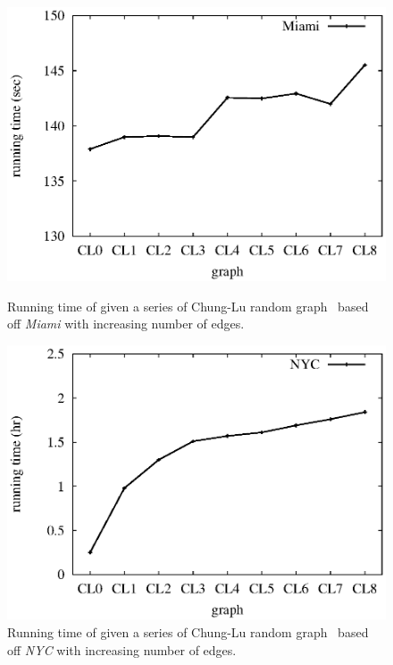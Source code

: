 \begin{figure}[htbp]
\hfill
\begin{minipage}[t]{0.45\linewidth}
\begin{center}
\centerline{\includegraphics[scale=0.35]{plots/harp-cl-miami.eps}}
\caption{Running time of \harpsahad{} given a series of Chung-Lu random graph \
based off \textit{Miami} with increasing number of edges.}
\label{fig:harp-cl-miami}
\end{center}
\end{minipage}
\hfill
\begin{minipage}[t]{0.45\linewidth}
\begin{center}
\centerline{\includegraphics[scale=0.35]{plots/harp-cl-nyc.eps}}
\caption{Running time of \harpsahad{} given a series of Chung-Lu random graph \
based off \textit{NYC} with increasing number of edges.}
\label{fig:harp-cl-nyc}
\end{center}
\end{minipage}
\hfill
\end{figure}



